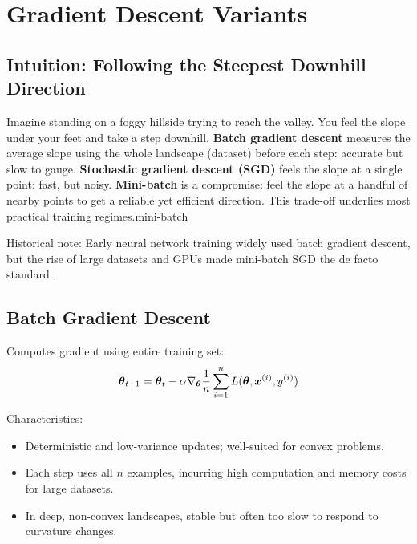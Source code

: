 
\section{Gradient Descent Variants}
\label{sec:gd-variants}

\subsection{Intuition: Following the Steepest Downhill Direction}

Imagine standing on a foggy hillside trying to reach the valley. You feel the slope under your feet and take a step downhill. \textbf{Batch gradient descent} measures the average slope using the whole landscape (dataset) before each step: accurate but slow to gauge. \textbf{Stochastic gradient descent (SGD)} feels the slope at a single point: fast, but noisy. \textbf{Mini-batch} is a compromise: feel the slope at a handful of nearby points to get a reliable yet efficient direction. This trade-off underlies most practical training regimes.\gls{mini-batch}

Historical note: Early neural network training widely used batch gradient descent, but the rise of large datasets and GPUs made mini-batch SGD the de facto standard \cite{GoodfellowEtAl2016,Prince2023}.

\subsection{Batch Gradient Descent}

Computes gradient using entire training set:
\begin{equation}
\boldsymbol{\theta}_{t+1} = \boldsymbol{\theta}_t - \alpha \nabla_{\boldsymbol{\theta}} \frac{1}{n} \sum_{i=1}^{n} L(\boldsymbol{\theta}, \boldsymbol{x}^{(i)}, y^{(i)})
\end{equation}

Characteristics:
\begin{itemize}
    \item Deterministic and low-variance updates; well-suited for convex problems.
    \item Each step uses all \(n\) examples, incurring high computation and memory costs for large datasets.
    \item In deep, non-convex landscapes, stable but often too slow to respond to curvature changes.
\end{itemize}

